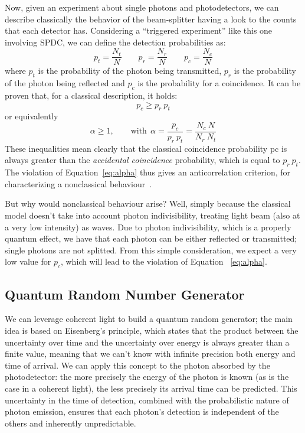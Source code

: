 \documentclass[prl,twocolumn]{revtex4-1}
\begin{document}
Now, given an experiment about single photons and photodetectors, we can describe classically the behavior of the beam-splitter having a look to the counts that each detector has. Considering a ``triggered experiment'' like this one involving SPDC, we can define the detection probabilities as:
%
\begin{equation}
    p_t = \frac{N_t}{N} \qquad p_r = \frac{N_r}{N} \qquad p_c = \frac{N_c}{N}
\end{equation}
%
where $p_t$ is the probability of the photon being transmitted, $p_r$ is the probability of the photon being reflected and $p_c$ is the probability for a coincidence. It can be proven that, for a classical description, it holds:
%
\begin{equation}
    p_c \geq p_r \: p_t
\end{equation}
%
or equivalently
%
\begin{equation}
    \alpha \geq 1, \qquad \text{with} \:\: \alpha = \frac{p_c}{p_r \: p_t} = \frac{N_c \: N}{N_r \: N_t}
    \label{eq:alpha}
\end{equation}
%
These inequalities mean clearly that the classical coincidence probability pc is always greater than the \textit{accidental coincidence} probability, which is equal to $p_r\:p_t$. The violation of Equation~\eqref{eq:alpha} thus gives an anticorrelation criterion, for characterizing a nonclassical behaviour~\cite{pap1}.

But why would nonclassical behaviour arise? Well, simply because the classical model doesn't take into account photon indivisibility, treating light beam (also at a very low intensity) as waves. Due to photon indivisibility, which is a properly quantum effect, we have that each photon can be either reflected or transmitted; single photons are not splitted. From this simple consideration, we expect a very low value for $p_c$, which will lead to the violation of Equation ~\eqref{eq:alpha}.



\subsection{Quantum Random Number Generator}
\label{sec:qrng_theory}
We can leverage coherent light to build a quantum random generator; the main idea is based on Eisenberg's principle, which states that the product between the uncertainty over time and the uncertainty over energy is always greater than a finite value, meaning that we can't know with infinite precision both energy and time of arrival. We can apply this concept to the photon absorbed by the photodetector: the more precisely the energy of the photon is known (as is the case in a coherent light), the less precisely its arrival time can be predicted. This uncertainty in the time of detection, combined with the probabilistic nature of photon emission, ensures that each photon’s detection is independent of the others and inherently unpredictable.
\end{document}
